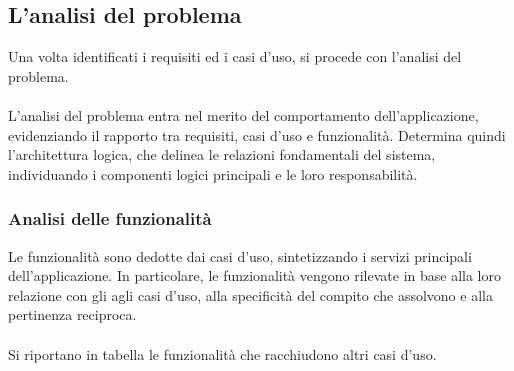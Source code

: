 \subsection{L’analisi del problema}

Una volta identificati i requisiti ed i casi d'uso, si procede con l'analisi del problema.\\
\\
L'analisi del problema entra nel merito del comportamento dell'applicazione,
 evidenziando il rapporto tra requisiti, casi d'uso e funzionalità.
Determina quindi l'architettura logica, che delinea le relazioni fondamentali del sistema, 
individuando i componenti logici principali e le loro responsabilità.\\

\subsubsection{Analisi delle funzionalità}
Le funzionalità sono dedotte dai casi d'uso, sintetizzando i servizi principali dell'applicazione.
In particolare, le funzionalità vengono rilevate in base alla loro relazione con gli agli casi d'uso,
alla specificità del compito che assolvono e alla pertinenza reciproca.\\
\\
Si riportano in tabella le funzionalità che racchiudono altri casi d'uso.

